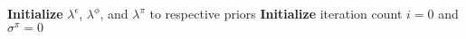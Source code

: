 \begin{algorithm}
\small
\DontPrintSemicolon
{}
\textbf{Initialize} $\lambda^\epsilon$, $\lambda^\phi$, and $\lambda^\pi$ to respective priors \;
\textbf{Initialize} iteration count $i = 0$ and $\sigma^\pi = 0$ \;
  


\end{algorithm}
